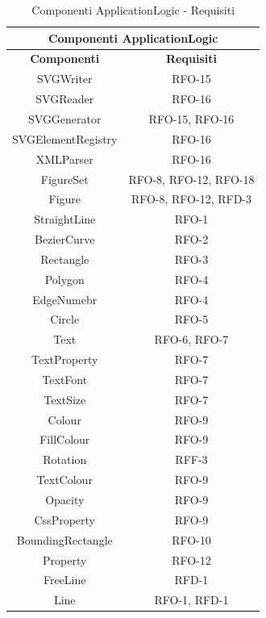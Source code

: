 \begin{table}[h]
\begin{center}
     \begin{tabular}
           {@{\extracolsep{\fill}}|c|c|}
      		\hline
           \multicolumn{2}{|c|}{ \textbf{Componenti ApplicationLogic} } \\
     \hline
      \textbf{Componenti} & \textbf{Requisiti} \\
      \hline
     SVGWriter & RFO-15 \\
     \hline
     SVGReader & RFO-16\\
     \hline
     SVGGenerator & RFO-15, RFO-16\\
     \hline
     SVGElementRegistry & RFO-16\\
     \hline
     XMLParser & RFO-16\\
     \hline
     FigureSet & RFO-8, RFO-12, RFO-18 \\
     \hline
     Figure & RFO-8, RFO-12, RFD-3 \\
     \hline
     StraightLine & RFO-1 \\
     \hline
     BezierCurve & RFO-2 \\
     \hline
     Rectangle & RFO-3 \\
     \hline
     Polygon & RFO-4 \\ 
     \hline
     EdgeNumebr & RFO-4 \\
     \hline
     Circle & RFO-5 \\
     \hline
     Text & RFO-6, RFO-7 \\
     \hline
     TextProperty & RFO-7 \\
     \hline
     TextFont & RFO-7 \\
     \hline
     TextSize & RFO-7\\
     \hline
     Colour & RFO-9 \\
     \hline
     FillColour & RFO-9 \\
     \hline
     Rotation & RFF-3 \\
     \hline
     TextColour & RFO-9 \\
     \hline
     Opacity & RFO-9 \\
     \hline
     CssProperty & RFO-9 \\
     \hline
     BoundingRectangle & RFO-10 \\
     \hline
     Property & RFO-12 \\
     \hline
     FreeLine & RFD-1 \\ 
     \hline
     Line & RFO-1, RFD-1 \\
    \hline %
    \end{tabular}
  \caption{Componenti ApplicationLogic - Requisiti} %
  \label{tab:requisitiAL}
  \end{center}
\end{table}
\newpage

